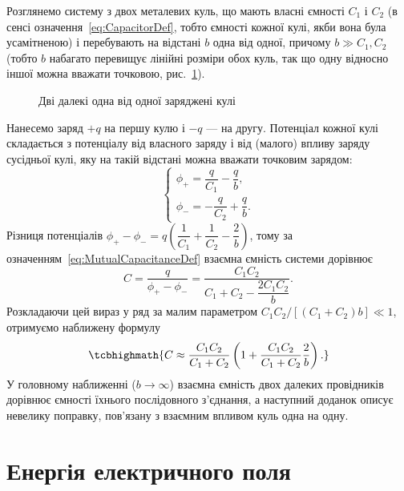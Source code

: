 Розглянемо систему з двох металевих куль, що мають власні ємності $C_1$ і $C_2$ (в сенсі означення~\eqref{eq:CapacitorDef}, тобто ємності кожної
кулі, якби вона була усамітненою) і перебувають на відстані $b$ одна від одної, причому $b \gg C_1, C_2$ (тобто $b$ набагато перевищує лінійні
розміри обох куль, так що одну відносно іншої можна вважати точковою, рис.~\ref{pic:TwoSpheres}).

\begin{figure}\centering
	\caption{Дві далекі одна від одної заряджені кулі\label{pic:TwoSpheres}}
\end{figure}

Нанесемо заряд $+q$ на першу кулю і $-q$ --- на другу. Потенціал кожної кулі складається з потенціалу від власного заряду і від (малого) впливу
заряду сусідньої кулі, яку на такій відстані можна вважати точковим зарядом:
\begin{equation*}
	\begin{cases}
		\phi_+ = \dfrac{q}{C_1} - \dfrac{q}{b}, \\[4pt]
		\phi_- = -\dfrac{q}{C_2} + \dfrac{q}{b}.
	\end{cases}
\end{equation*}
Різниця потенціалів $\phi_+ - \phi_- = q\left(\dfrac1{C_1} + \dfrac1{C_2} - \dfrac2b\right)$, тому за
означенням~\eqref{eq:MutualCapacitanceDef} взаємна ємність системи дорівнює
\begin{equation*}
	C = \frac{q}{\phi_+ - \phi_-} = \frac{C_1 C_2}{C_1 + C_2 - \dfrac{2C_1C_2}{b}}.
\end{equation*}
Розкладаючи цей вираз у ряд за малим параметром $C_1C_2/[(C_1+C_2)b] \ll 1$, отримуємо наближену формулу
\begin{equation}\label{eq:TwoSpheresCap}
	\tcbhighmath{
		C \approx \frac{C_1C_2}{C_1+C_2}\left(1 + \frac{C_1C_2}{C_1+C_2}\frac{2}{b}\right).
	}
\end{equation}
У головному наближенні ($b \to \infty$) взаємна ємність двох далеких провідників дорівнює ємності їхнього послідовного з'єднання, а наступний доданок
описує невелику поправку, пов'язану з взаємним впливом куль одна на одну.

\section{Енергія електричного поля}

